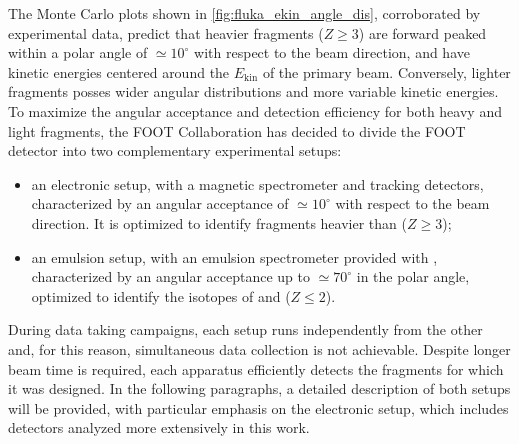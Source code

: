 The Monte Carlo plots shown in \autoref{fig:fluka_ekin_angle_dis}, corroborated by experimental data, predict that heavier fragments ($Z\geq3$) are forward peaked within a polar angle of $\simeq10^{\circ}$ with respect to the beam direction, and have kinetic energies centered around the $E_\text{kin}$ of the primary beam. Conversely, lighter fragments posses wider angular distributions and more variable kinetic energies. To maximize the angular acceptance and detection efficiency for both heavy and light fragments, the FOOT Collaboration has decided to divide the FOOT detector into two complementary experimental setups:
\begin{itemize}
	\item an electronic setup, with a magnetic spectrometer and tracking detectors, characterized by an angular acceptance of $\simeq10^{\circ}$ with respect to the beam direction. It is optimized to identify fragments heavier than  ($Z\geq3$);
	\item an emulsion setup, with an emulsion spectrometer provided with , characterized by an angular acceptance up to $\simeq70^{\circ}$ in the polar angle, optimized to identify the isotopes of  and  ($Z\leq2$).
\end{itemize}
During data taking campaigns, each setup runs independently from the other and, for this reason, simultaneous data collection is not achievable. Despite longer beam time is required, each apparatus efficiently detects the fragments for which it was designed. In the following paragraphs, a detailed description of both setups will be provided, with particular emphasis on the electronic setup, which includes detectors analyzed more extensively in this work.
